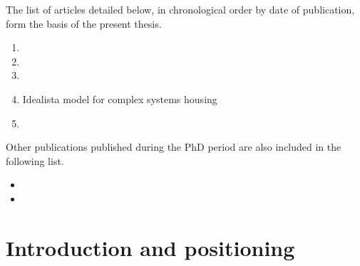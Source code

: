 \documentclass[
	11pt, %
	a4paper,
]{LegrandOrangeBook}
\begin{document}
The list of articles detailed below, in chronological order by date of publication, form the basis of the present thesis.
\vspace{0.5 cm}

\begin{enumerate}
	\item {}
	\vspace{0.5 cm}
	\item {}
	\vspace{0.5 cm}
	\item {}
	\vspace{0.5 cm}
	\item Idealista model for complex systems housing
	\vspace{0.5 cm}
	\item {}
	\vspace{0.5 cm}
\end{enumerate}

\vspace{0.5 cm}
Other publications published during the PhD period are also included in the following list.

\vspace{0.5 cm}
\begin{itemize}
	\item {}
	\vspace{0.5 cm}
	\item {}
	\vspace{0.5 cm}
\end{itemize}

\chapterspaceabove{6.75cm}
\chapterspacebelow{7.25cm}

\chapter{Introduction and positioning}
%

\chapterspaceabove{6.75cm}
\chapterspacebelow{7.25cm}
\end{document}
